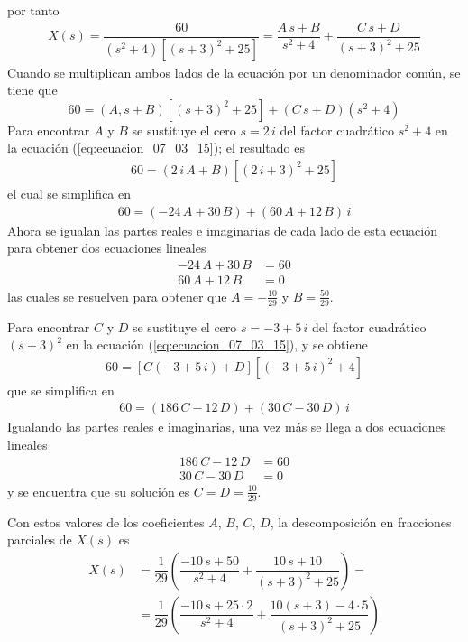 por tanto
\begin{align*}
X(s) = \dfrac{60}{(s^{2} + 4)[(s+3)^{2} + 25]} = \dfrac{A \, s + B}{s^{2} + 4} + \dfrac{C \, s + D}{(s+3)^{2} + 25}
\end{align*}
Cuando se multiplican ambos lados de la ecuación por un denominador común, se tiene que
\begin{equation}
60 = (A , s + B) [(s+3)^{2} + 25] + (C \, s + D)(s^{2} + 4)
\label{eq:ecuacion_07_03_15}
\end{equation}
Para encontrar $A$ y $B$ se sustituye el cero $s = 2 \, i$ del factor cuadrático $s^{2} + 4$ en la ecuación (\ref{eq:ecuacion_07_03_15}); el resultado es
\begin{align*}
60 = (2 \, i \, A + B)[(2 \, i + 3)^{2} + 25]
\end{align*}
el cual se simplifica en
\begin{align*}
60 = (-24 \, A + 30 \, B) + (60 \, A + 12 \, B) \, i
\end{align*}
Ahora se igualan las partes reales e imaginarias de cada lado de esta ecuación para obtener dos ecuaciones lineales
\begin{align*}
-24 \, A + 30 \, B &= 60 \\
60 \, A + 12 \, B &= 0
\end{align*}
las cuales se resuelven para obtener que $A = - \frac{10}{29}$ y $B = \frac{50}{29}$.
\par
Para encontrar $C$ y $D$ se sustituye el cero $s=-3 + 5 \, i$ del factor cuadrático $(s+3)^{2}$ en la ecuación (\ref{eq:ecuacion_07_03_15}), y se obtiene
\begin{align*}
60 = [C (-3 +  5 \, i) + D][(-3 + 5 \, i)^{2} + 4]
\end{align*}
que se simplifica en
\begin{align*}
60 = (186 \, C -12 \, D) + (30 \, C - 30 \, D) \, i
\end{align*}
Igualando las partes reales e imaginarias, una vez más se llega a dos ecuaciones lineales
\begin{align*}
186 \, C - 12 \, D &= 60 \\
30 \, C - 30 \, D &= 0
\end{align*}
y se encuentra que su solución es $C = D = \frac{10}{29}$.
\par
Con estos valores de los coeficientes $A$, $B$, $C$, $D$, la descomposición en fracciones parciales de $X(s)$ es
\begin{align*}
X(s) &= \dfrac{1}{29} \left( \dfrac{-10 \, s + 50}{s^{2} + 4} + \dfrac{10 \, s + 10}{(s + 3)^{2} + 25} \right) = \\
&= \dfrac{1}{29} \left( \dfrac{-10 \, s + 25 \cdot 2}{s^{2} + 4} + \dfrac{10 (s+3) - 4 \cdot 5}{(s+3)^{2} + 25} \right)
\end{align*}
